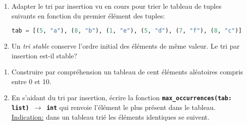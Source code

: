 \documentclass[a4paper,11pt]{article}
\begin{document}
\begin{exo}
\begin{enumerate}
    \item Adapter le tri par insertion vu en cours pour trier le tableau de tuples suivants en fonction du premier élément des tuples:
    \begin{center}
    \begin{lstlisting}[language=Python]
tab = [(5, "a"), (8, "b"), (1, "e"), (5, "d"), (7, "f"), (8, "c")]
    \end{lstlisting}
    \end{center}
    \item Un \emph{tri stable} conserve l'ordre initial des éléments de même valeur. Le tri par insertion est-il stable?
\end{enumerate}
\end{exo}
\begin{exo}
\begin{enumerate}
    \item Construire par compréhension un tableau de cent éléments aléatoires compris entre 0 et 10.
    \item En s'aidant du tri par insertion, écrire la fonction \textbf{\texttt{max\_occurrences(tab: list) $\rightarrow$ int}} qui renvoie l'élément le plus présent dans le tableau. \underline{Indication:} dans un tableau trié les éléments identiques se suivent. 
\end{enumerate}
\end{exo}
\end{document}

